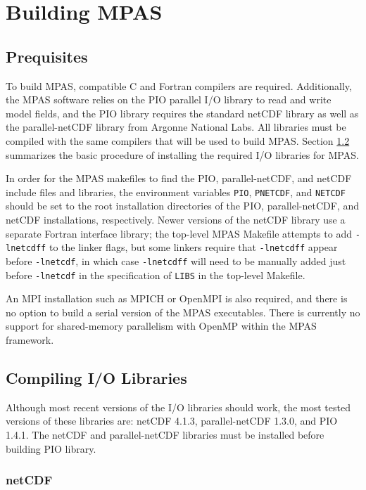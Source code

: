 \chapter{Building MPAS}
\label{chap:mpas_build_instructions}

\section{Prequisites}

To build MPAS, compatible C and Fortran compilers are required. Additionally, the MPAS software relies on the PIO parallel I/O library to read and write model fields, and the PIO library requires the standard netCDF library as well as the parallel-netCDF library from Argonne National Labs. All libraries must be compiled with the same compilers that will be used to build MPAS. Section \ref{sec:build_io} summarizes the basic procedure of installing the required I/O libraries for MPAS.

In order for the MPAS makefiles to find the PIO, parallel-netCDF, and netCDF include files and libraries, the environment variables {\tt PIO}, {\tt PNETCDF}, and {\tt NETCDF} should be set to the root installation directories of the PIO, parallel-netCDF, and netCDF installations, respectively. Newer versions of the netCDF library use a separate Fortran interface library; the top-level MPAS Makefile attempts to add {\tt -lnetcdff} to the linker flags, but some linkers require that {\tt -lnetcdff} appear before {\tt -lnetcdf}, in which case {\tt -lnetcdff} will need to be manually added just before {\tt -lnetcdf} in the specification of {\tt LIBS} in the top-level Makefile.

An MPI installation such as MPICH or OpenMPI is also required, and there is no option to build a serial version of the MPAS executables. There is currently no support for shared-memory parallelism with OpenMP within the MPAS framework.


\section{Compiling I/O Libraries}
\label{sec:build_io}

Although most recent versions of the I/O libraries should work, the most tested versions of these libraries are: netCDF 4.1.3, parallel-netCDF 1.3.0, and PIO 1.4.1. The netCDF and parallel-netCDF libraries must be installed before building PIO library.

\subsection{netCDF}

